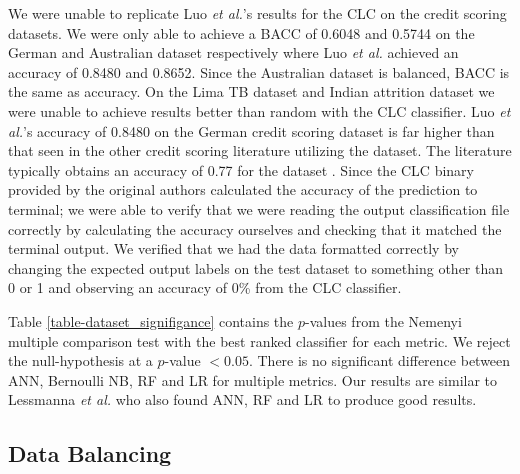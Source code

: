 \documentclass{sig-alternate-05-2015}
\begin{document}
	We were unable to replicate Luo \textit{et al.}'s \cite{Luo20097562} results for the CLC on the credit scoring datasets. We were only able to achieve a BACC of 0.6048 and 0.5744 on the German and Australian dataset respectively where Luo \textit{et al.} achieved an accuracy of 0.8480 and 0.8652. Since the Australian dataset is balanced, BACC is the same as accuracy. On the Lima TB dataset and Indian attrition dataset we were unable to achieve results better than random with the CLC classifier. Luo \textit{et al.}'s accuracy of 0.8480 on the German credit scoring dataset is far higher than that seen in the other credit scoring literature utilizing the dataset. The literature typically obtains an accuracy of 0.77 for the dataset \cite{Huang2007847, Nanni20093028, Tsai20082639, Wang2011223}. Since the CLC binary provided by the original authors \cite{Chen2006} calculated the accuracy of the prediction to terminal; we were able to verify that we were reading the output classification file correctly by calculating the accuracy ourselves and checking that it matched the terminal output. We verified that we had the data formatted correctly by changing the expected output labels on the test dataset to something other than 0 or 1 and observing an accuracy of 0\% from the CLC classifier. 
	
	Table \ref{table-dataset_signifigance} contains the $p$-values from the Nemenyi multiple comparison test with the best ranked classifier for each metric. We reject the null-hypothesis at a $p$-value $< 0.05$. There is no significant difference between ANN, Bernoulli NB, RF and LR for multiple metrics. Our results are similar to Lessmanna \textit{et al.} \cite{lessmanna2013benchmarking} who also found ANN, RF and LR to produce good results.	
	
	
	\subsection{Data Balancing}
	
\end{document}
